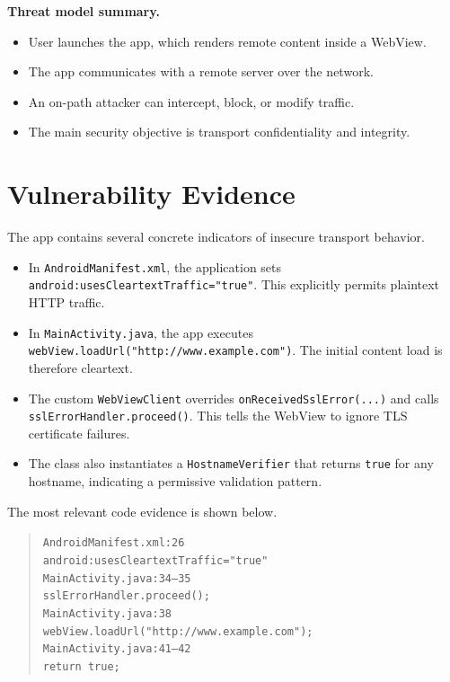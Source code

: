 \documentclass[10pt,twocolumn,letterpaper]{article}
\begin{document}
\noindent\textbf{Threat model summary.}
\begin{itemize}
  \item User launches the app, which renders remote content inside a WebView.
  \item The app communicates with a remote server over the network.
  \item An on-path attacker can intercept, block, or modify traffic.
  \item The main security objective is transport confidentiality and integrity.
\end{itemize}

\section{Vulnerability Evidence}
The app contains several concrete indicators of insecure transport behavior.

\begin{itemize}
  \item In \texttt{AndroidManifest.xml}, the application sets \texttt{android:usesCleartextTraffic="true"}. This explicitly permits plaintext HTTP traffic.
  \item In \texttt{MainActivity.java}, the app executes \texttt{webView.loadUrl("http://www.example.com")}. The initial content load is therefore cleartext.
  \item The custom \texttt{WebViewClient} overrides \texttt{onReceivedSslError(...)} and calls \texttt{sslErrorHandler.proceed()}. This tells the WebView to ignore TLS certificate failures.
  \item The class also instantiates a \texttt{HostnameVerifier} that returns \texttt{true} for any hostname, indicating a permissive validation pattern.
\end{itemize}

\noindent The most relevant code evidence is shown below.

\begin{quote}
\small
\texttt{AndroidManifest.xml:26} \\
\texttt{android:usesCleartextTraffic="true"} \\
\texttt{MainActivity.java:34--35} \\
\texttt{sslErrorHandler.proceed();} \\
\texttt{MainActivity.java:38} \\
\texttt{webView.loadUrl("http://www.example.com");} \\
\texttt{MainActivity.java:41--42} \\
\texttt{return true;}
\normalsize
\end{quote}
\end{document}

